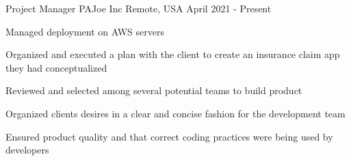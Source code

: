 \begin{cventries}
  \cventry
    {Project Manager} %
    {PAJoe Inc} %
    {Remote, USA} %
    {April 2021 - Present } %
    {
      \begin{cvitems} %
        \item Managed deployment on AWS servers
        \item Organized and executed a plan with the client to create an insurance claim app they had conceptualized
        \item Reviewed and selected among several potential teams to build product
        \item Organized clients desires in a clear and concise fashion for the development team
        \item Ensured product quality and that correct coding practices were being used by developers
      \end{cvitems}
    }
\end{cventries}
